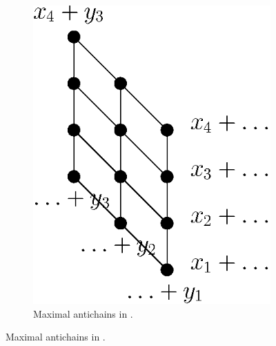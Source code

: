\begin{figure}
\begin{subfigure}[b]{0.4\textwidth}
	\includegraphics[width=\textwidth]{fig/open/x+y}
	\caption{Maximal antichains in \XY.}
	\label{fig:xy:poset:antichains}
\end{subfigure}
\end{figure}

